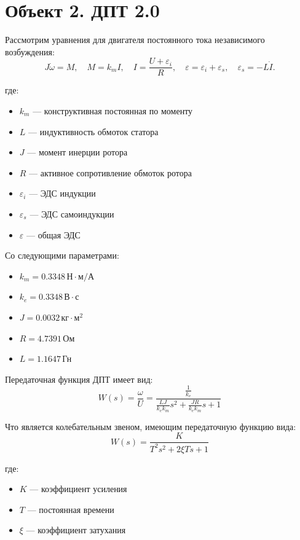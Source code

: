 \chapter{Объект 2. ДПТ 2.0}
Рассмотрим уравнения для двигателя постоянного тока независимого возбуждения:
\[
J\dot{\omega} = M, \quad M = k_m I, \quad I = \frac{U + \varepsilon_i}{R}, 
\quad \varepsilon = \varepsilon_i + \varepsilon_s, \quad \varepsilon_s = -L\dot I.
\]

где:
\begin{itemize}
    \item[] \( k_m \) — конструктивная постоянная по моменту
    \item[] \( L \) — индуктивность обмоток статора
    \item[] \( J \) — момент инерции ротора
    \item[] \( R \) — активное сопротивление обмоток ротора
    \item[] \( \varepsilon_i \) — ЭДС индукции
    \item[] \( \varepsilon_s \) — ЭДС самоиндукции
    \item[] \( \varepsilon \) — общая ЭДС
\end{itemize}

Со следующими параметрами:
\begin{itemize}
    \item[] \( k_m = 0.3348\, \text{Н} \cdot \text{м} / \text{А} \)
    \item[] \( k_e = 0.3348\, \text{В} \cdot \text{с}\)
    \item[] \( J = 0.0032\, \text{кг} \cdot \text{м}^2\)
    \item[] \( R = 4.7391\, \text{Ом}\)
    \item[] \( L =  1.1647\, \text{Гн} \)
\end{itemize}

Передаточная функция ДПТ имеет вид:
\[
    W(s) = \frac{\omega}{U} = \frac{\frac{1}{k_e}}{\frac{LJ}{k_e k_m}s^2 + \frac{JR}{k_e k_m}s + 1}
\]

Что является колебательным звеном, имеющим передаточную функцию вида:
\[
    W(s) = \frac{K}{T^2 s^2 + 2 \xi T s + 1}
\]

где:
\begin{itemize}
    \item[] \( K \) — коэффициент усиления
    \item[] \( T \) — постоянная времени
    \item[] \( \xi \) — коэффициент затухания
\end{itemize}

